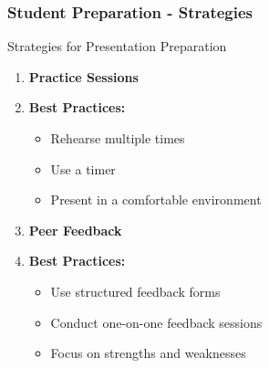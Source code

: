 \documentclass[aspectratio=169]{beamer}
\begin{document}
\begin{frame}[fragile]
    \frametitle{Student Preparation - Strategies}
    \begin{block}{Strategies for Presentation Preparation}
        \begin{enumerate}
            \item \textbf{Practice Sessions}
                    \item \textbf{Best Practices:} 
                        \begin{itemize}
                            \item Rehearse multiple times
                            \item Use a timer
                            \item Present in a comfortable environment
                        \end{itemize}
            \item \textbf{Peer Feedback}
                    \item \textbf{Best Practices:} 
                        \begin{itemize}
                            \item Use structured feedback forms
                            \item Conduct one-on-one feedback sessions
                            \item Focus on strengths and weaknesses
                        \end{itemize}
        \end{enumerate}
    \end{block}
\end{frame}
\end{document}
